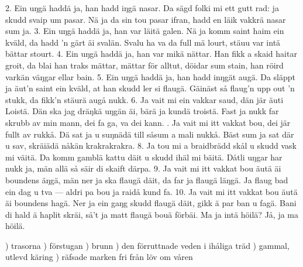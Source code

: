 \setlength{\columnsep}{0.2cm}
\begin{multicols}{2}
2.  Ein uŋgä haddä ja,
    han hadd iŋgä nasar.
    Da sägd folki mi ett gutt rad:
    ja skudd svaip um pasar.
    Nä ja da sin tou pasar ifran,
    hadd en läik vakkrä nasar sum ja.
3.  Ein uŋgä haddä ja,
    han var läitä galen.
    Nä ja komm saint haim ein kväld,
    da hadd ’n gärt äi svalän.
    Svalu ha va da full mä lourt,
    stäuu var intä bättar stourt.
4.  Ein uŋgä haddä ja,
    han var mikä nättar.
    Han fikk a skaid haitar groit,
    da blai han traks mättar,
    mättar för alltut, döidar sum stain,
    han röird varkän väŋgar ellar bain.
5.  Ein uŋgä haddä ja,
    han hadd inŋgät augä.
    Da släppt ja äut’n saint ein kväld,
    at han skudd ler si flaugä.
    Gäinäst så flaug’n upp out ’n stukk,
    da fikk’n stäurä augå nukk.
6.  Ja vait mi ein vakkar saud,
    dän jär äuti Loistä.
    Dän ska jag dräŋkä uŋgän äi,
    bärä ja kundä troistä.
    Fast ja nukk far skrubb av min mann,
    dei fa ga, va dei kann.
\vfill{}.  Ja vait mi itt vakkat bou,
    dei jär fullt av rukkå.
    Dä sat ja u suŋnädä till
    såsum a mali nukkå.
    Bäst sum ja sat där u sav,
    skräiädä nåkän krakrakrakra.
8.  Ja tou mi a braidbrädd skål
    u skudd vask mi väitä.
    Da komm gamblä kattu däit
    u skudd ihäl mi bäitä.
    Dåtli uŋgar har nukk ja,
    män allä så säir di skaift därpa.
9.  Ja vait mi itt vakkat bou
    äutä äi boundens äŋgä,
    män ner ja ska flaugä däit,
    da far ja flaugä läŋgä.
    Ja flaug bad ein dag u tva —
    aldri pa bou ja raidå kund fa.
10. Ja vait mi itt vakkat bou
    äutä äi boundens hagä.
    Ner ja ein gaŋg skudd flaugä däit,
    gikk ä par ban u fagä.
    Bani di hald ä haplit skräi,
    så’t ja matt flaugä bouä förbäi.
    \qquad{}Ma ja intä höilä?
    \qquad{}Jå, ja ma höilä.
\end{multicols}
    
\vspace{5mm}
\tabto{0.2cm}) trasorna
\tabto{0.2cm}) förstugan
\tabto{0.2cm}) brunn
\tabto{0.2cm}) den förruttnade veden i ihåliga träd
\tabto{0.2cm}) gammal, utlevd käring
\tabto{0.2cm}) räfsade marken fri från löv om våren
